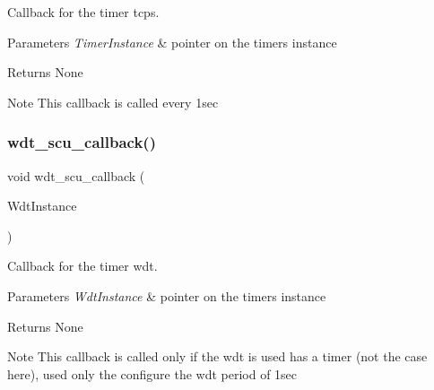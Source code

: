 Callback for the timer tcps. 


\begin{DoxyParams}{Parameters}
{\em Timer\+Instance} & pointer on the timer\textquotesingle{}s instance\\
\hline
\end{DoxyParams}
\begin{DoxyReturn}{Returns}
None
\end{DoxyReturn}
\begin{DoxyNote}{Note}
This callback is called every 1sec 
\end{DoxyNote}
\mbox{\label{interrupt_8c_a705bdde8a413627bbe58f5e24e723eb2}} 
\subsubsection{wdt\_scu\_callback()}
{\footnotesize\ttfamily void wdt\+\_\+scu\+\_\+callback (\begin{DoxyParamCaption}\item[{X\+Scu\+Wdt $\ast$}]{Wdt\+Instance }\end{DoxyParamCaption})}



Callback for the timer wdt. 


\begin{DoxyParams}{Parameters}
{\em Wdt\+Instance} & pointer on the timer\textquotesingle{}s instance\\
\hline
\end{DoxyParams}
\begin{DoxyReturn}{Returns}
None
\end{DoxyReturn}
\begin{DoxyNote}{Note}
This callback is called only if the wdt is used has a timer (not the case here), used only the configure the wdt period of 1sec 
\end{DoxyNote}

